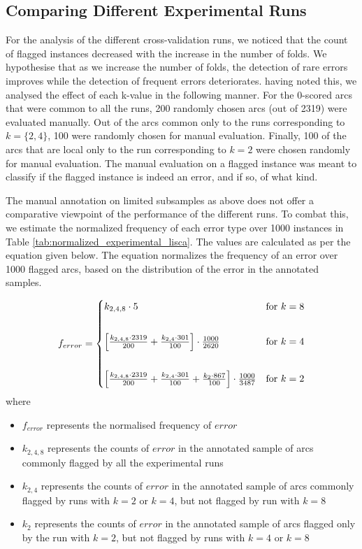 \subsection{Comparing Different Experimental Runs}
\label{analysis:all}

For the analysis of the different cross-validation runs, we noticed that the count of flagged instances decreased with the increase in the number of folds. We hypothesise that as we increase the number of folds, the detection of rare errors improves while the detection of frequent errors deteriorates. having noted this, we analysed the effect of each k-value in the following manner. For the 0-scored arcs that were common to all the runs, 200 randomly chosen arcs (out of 2319) were evaluated manually. Out of the arcs common only to the runs corresponding to $k= \{2, 4\}$, 100 were randomly chosen for manual evaluation. Finally, 100 of the arcs that are local only to the run corresponding to $k=2$ were chosen randomly for manual evaluation. The manual evaluation on a flagged instance was meant to classify if the flagged instance is indeed an error, and if so, of what kind.

The manual annotation on limited subsamples as above does not offer a comparative viewpoint of the performance of the different runs. To combat this, we estimate the normalized frequency of each error type over 1000 instances in Table \ref{tab:normalized_experimental_lisca}. The values are calculated as per the equation given below. The equation normalizes the frequency of an error over 1000 flagged arcs, based on the distribution of the error in the annotated samples.

    \[f_{error} = 
    \begin{cases}
    k_{2,4,8} \cdot 5 &\text{for }k=8\\
    \vspace{2mm}\\
    \left[ \frac{k_{2,4,8} \cdot 2319}{200} + \frac{k_{2,4} \cdot 301}{100} \right] \cdot \frac{1000}{2620} & \text{for }k=4\\
    \vspace{2mm}\\
    \left[ \frac{k_{2,4,8} \cdot 2319}{200} + \frac{k_{2,4} \cdot 301}{100} + \frac{k_{2} \cdot 867}{100} \right] \cdot \frac{1000}{3487} & \text{for }k=2
    \end{cases}\]
where
\begin{itemize}
    \item $f_{error}$ represents the normalised frequency of $error$
    \item $k_{2,4,8}$ represents the counts of $error$ in the annotated sample of arcs commonly flagged by all the experimental runs
    \item $k_{2,4}$ represents the counts of $error$ in the annotated sample of arcs commonly flagged by runs with $k=2$ or $k=4$, but not flagged by run with $k=8$
    \item $k_{2}$ represents the counts of $error$ in the annotated sample of arcs flagged only by the run with $k=2$, but not flagged by runs with $k=4$ or $k=8$
\end{itemize}

